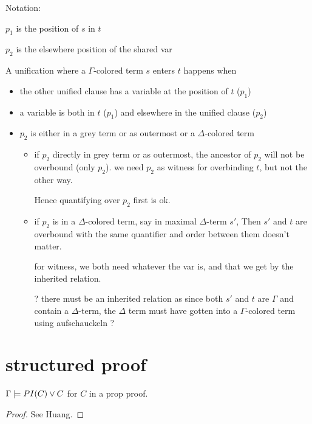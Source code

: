 \documentclass[,%
	paper=a4,%
	DIV14, 
	liststotoc,
	bibtotoc,
	draft=false,%
	numbers=noendperiod
]{scrartcl}
\begin{document}
\vspace{4em}

Notation:

$p_1$ is the position of $s$ in $t$

$p_2$ is the elsewhere position of the shared var 


A unification where a $\Gamma$-colored term $s$ enters $t$ happens when 

\begin{itemize}
	\item the other unified clause has a variable at the position of $t$ ($p_1$)
	\item a variable is both in $t$ ($p_1$) and elsewhere in the unified clause ($p_2$)
	\item $p_2$ is either in a grey term or as outermost or a $\Delta$-colored term
		\begin{itemize}
			\item if $p_2$ directly in grey term or as outermost, the ancestor of $p_2$ will not be overbound (only $p_2$).
				we need $p_2$ as witness for overbinding $t$, but not the other way.

				Hence quantifying over $p_2$ first is ok.

			\item
				if $p_2$ is in a $\Delta$-colored term, say in maximal $\Delta$-term $s'$,
				Then $s'$ and $t$ are overbound with the same quantifier and order between them doesn't matter.

				for witness, we both need whatever the var is, and that we get by the inherited relation.

				? there must be an inherited relation as since both $s'$ and $t$ are $\Gamma$ and contain a $\Delta$-term, the $\Delta$ term must have gotten into a $\Gamma$-colored term using aufschauckeln ?
		\end{itemize}
\end{itemize}



\section{structured proof}

\begin{lemma}
	$\Gamma \models PI(C) \lor C$ for $C$ in a prop proof.
	\label{structured1}
\end{lemma}
\begin{proof}
	See Huang.
\end{proof}
\end{document}
